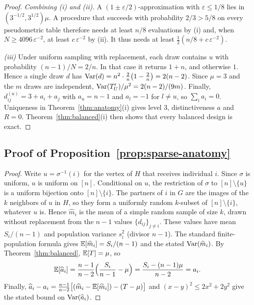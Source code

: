 \begin{proof}
\emph{Combining (i) and (ii).} A $(1\pm\varepsilon/2)$-approximation with
$\varepsilon\le1/8$ lies in $(3^{-1/2},3^{1/2})\mu$. A procedure that succeeds with
probability $2/3>5/8$ on every pseudometric table therefore needs at least $n/8$
evaluations by (i) and, when $N\ge4096\,\varepsilon^{-2}$, at least $c\,\varepsilon^{-2}$ by (ii). It thus needs at
least $\tfrac12(n/8+c\,\varepsilon^{-2})$.

\emph{(iii)} Under uniform sampling with replacement, each draw contains $u$ with
probability $(n-1)/N=2/n$. In that case it returns $1+n$, and otherwise $1$. Hence
a single draw $d$ has $\operatorname{Var}(d)={n^2\cdot\frac2n\bigl(1-\frac2n\bigr)}=2(n-2)$. Since
$\mu=3$ and the $m$ draws are independent, $\operatorname{Var}(T_U')/\mu^2=2(n-2)/(9m)$. Finally, $d^{(u)}_{ij}=3+a_i+a_j$ with $a_u=n-1$
and $a_l=-1$ for $l\neq u$, so $\sum_ia_i=0$. Uniqueness in
Theorem~\ref{thm:anatomy}(i) gives level $3$, distinctiveness $a$ and $R=0$.
Theorem~\ref{thm:balanced}(i) then shows that every balanced design is exact.
\end{proof}

\subsection{Proof of Proposition~\ref{prop:sparse-anatomy}}
\label{app:supp-sparse-dico}

\begin{proof}
Write $u=\sigma^{-1}(i)$ for the vertex of $H$ that receives individual $i$.
Since $\sigma$ is uniform, $u$ is uniform on $[n]$. Conditional on $u$, the
restriction of $\sigma$ to $[n]\setminus\{u\}$ is a uniform bijection onto
$[n]\setminus\{i\}$. The partners of $i$ in $G$ are the images of the $k$
neighbors of $u$ in $H$, so they form a uniformly random $k$-subset of
$[n]\setminus\{i\}$, whatever $u$ is. Hence $\widehat m_i$ is the mean of a simple
random sample of size $k$, drawn without replacement from the $n-1$ values
$\{d_{ij}\}_{j\ne i}$. These values have mean $S_i/(n-1)$ and population variance
$s_i^2$ (divisor $n-1$). The standard finite-population formula
\citep{cochran1977sampling} gives $\mathbb{E}[\widehat m_i]=S_i/(n-1)$ and the stated
$\operatorname{Var}(\widehat m_i)$. By Theorem~\ref{thm:balanced}, $\mathbb{E}[T]=\mu$, so
\[
\mathbb{E}[\widehat a_i]=\frac{n-1}{n-2}\Big(\frac{S_i}{n-1}-\mu\Big)=\frac{S_i-(n-1)\mu}{n-2}=a_i .
\]
Finally, $\widehat a_i-a_i=\frac{n-1}{n-2}\big[(\widehat m_i-\mathbb{E}[\widehat m_i])-(T-\mu)\big]$
and $(x-y)^2\le2x^2+2y^2$ give the stated bound on $\operatorname{Var}(\widehat a_i)$.
\end{proof}

